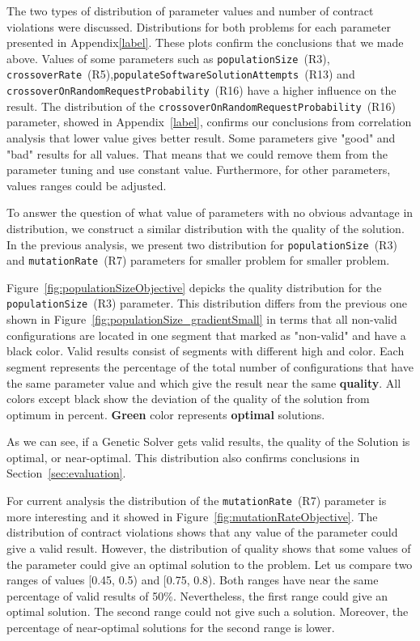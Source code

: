 The two types of distribution of parameter values and number of contract violations were discussed. Distributions for both problems for each parameter presented in Appendix\ref{label}. These plots confirm the conclusions that we made above. Values of some parameters such as \texttt{populationSize}~(R3), \texttt{crossoverRate}~(R5),\linebreak \texttt{populateSoftwareSolutionAttempts}~(R13) and \texttt{crossoverOnRandomRequestProbability}~(R16) have a higher influence on the result.
The distribution  of the \texttt{crossoverOnRandomRequestProbability}~(R16) parameter, showed in Appendix~\ref{label}, confirms our conclusions from correlation analysis that lower value gives better result. 
Some parameters give "good" and "bad" results for all values. That means that we could remove them from the parameter tuning and use constant value. Furthermore, for other parameters, values ranges could be adjusted.

To answer the question of what value of parameters with no obvious advantage in distribution, we construct a similar distribution with the quality of the solution.
In the previous analysis, we present two distribution for \texttt{populationSize}~(R3) and \texttt{mutationRate}~(R7) parameters for smaller problem for smaller problem.

Figure~\ref{fig:populationSizeObjective} depicks the quality distribution for the \texttt{populationSize}~(R3) parameter. This distribution differs from the previous one shown in Figure~\ref{fig:populationSize_gradientSmall} in terms that all non-valid configurations are located in one segment that marked as "non-valid" and have a black color. Valid results consist of segments with different high and color. Each segment represents the percentage of the total number of configurations that have the same parameter value and which give the result near the same \textbf{quality}. All colors except black show the deviation of the quality of the solution from optimum in percent. \textbf{Green} color represents \textbf{optimal} solutions.

As we can see, if a Genetic Solver gets valid results, the quality of the Solution is optimal, or near-optimal. This distribution also confirms conclusions in Section~\ref{sec:evaluation}.

For current analysis the distribution of the \texttt{mutationRate}~(R7) parameter is more interesting and it showed in Figure~\ref{fig:mutationRateObjective}. The distribution of contract violations shows that any value of the parameter could give a valid result. However, the distribution of quality shows that some values of the parameter could give an optimal solution to the problem. Let us compare two ranges of values [0.45, 0.5) and [0.75, 0.8). Both ranges have near the same percentage of valid results of 50\%.
Nevertheless, the first range could give an optimal solution. The second range could not give such a solution. Moreover, the percentage of near-optimal solutions for the second range is lower.


